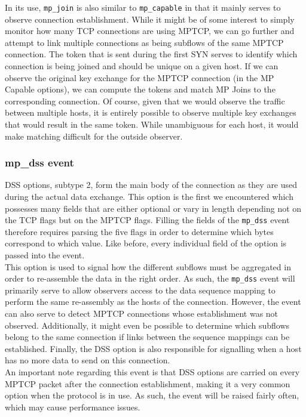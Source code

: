 In its use, \texttt{mp\_join} is also similar to \texttt{mp\_capable} in that it mainly serves to observe connection establishment. While it might be of some interest to simply monitor how many TCP connections are using MPTCP, we can go further and attempt to link multiple connections as being subflows of the same MPTCP connection. The token that is sent during the first SYN serves to identify which connection is being joined and should be unique on a given host. If we can observe the original key exchange for the MPTCP connection (in the MP Capable options), we can compute the tokens and match MP Joins to the corresponding connection. Of course, given that we would observe the traffic between multiple hosts, it is entirely possible to observe multiple key exchanges that would result in the same token. While unambiguous for each host, it would make matching difficult for the outside observer. \\

\subsubsection{mp\_dss event}
DSS options, subtype 2, form the main body of the connection as they are used during the actual data exchange. This option is the first we encountered which possesses many fields that are either optional or vary in length depending not on the TCP flags but on the MPTCP flags. Filling the fields of the \texttt{mp\_dss} event therefore requires parsing the five flags in order to determine which bytes correspond to which value. Like before, every individual field of the option is passed into the event. \\

This option is used to signal how the different subflows must be aggregated in order to re-assemble the data in the right order. As such, the \texttt{mp\_dss} event will primarily serve to allow observers access to the data sequence mapping to perform the same re-assembly as the hosts of the connection. However, the event can also serve to detect MPTCP connections whose establishment was not observed. Additionally, it might even be possible to determine which subflows belong to the same connection if links between the sequence mappings can be established. Finally, the DSS option is also responsible for signalling when a host has no more data to send on this connection.\\

An important note regarding this event is that DSS options are carried on every MPTCP packet after the connection establishment, making it a very common option when the protocol is in use. As such, the event will be raised fairly often, which may cause performance issues.

